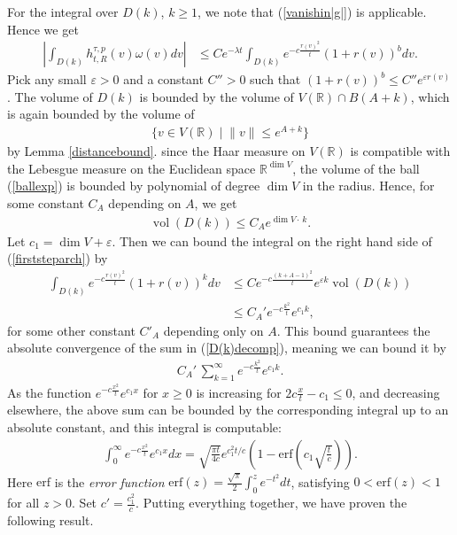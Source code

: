 \documentclass[11pt,reqno]{amsart}
\numberwithin{equation}{section}
\theoremstyle{definition}
\theoremstyle{remark}
\newcommand{\vol}{\operatorname{vol}}
\renewcommand{\dim}{\operatorname{dim}}
\newcommand{\R}{\mathbb{R}}
\renewcommand{\epsilon}{\varepsilon}
\begin{document}
For the integral over $D(k)$, $k\geq 1$, we note that (\ref{vanishin|g|}) is applicable. Hence we get
\begin{align}\label{firststeparch}
    \left\vert \int_{D(k)} h^{\tau,p}_{t,R}(v)\omega(v)dv\right\vert &\leq C e^{-\lambda t}\int_{D(k)} e^{-c\frac{r(v)^2}{t}}(1+r(v))^bdv.
\end{align}
Pick any small $\epsilon>0$ and a constant $C''>0$ such that $(1+r(v))^b\leq C''e^{\epsilon r(v)}$. The volume of $D(k)$ is bounded by the volume of $V(\R)\cap B(A+k)$, which is again bounded by the volume of
\begin{align}\label{ballexp}
    \lbrace v\in V(\R) \mid \lVert v\rVert \leq e^{A+k}\rbrace
\end{align}
by Lemma \ref{distancebound}. since the Haar measure on $V(\R)$ is compatible with the Lebesgue measure on the Euclidean space $\R^{\dim V}$, the volume of the ball (\ref{ballexp}) is bounded by polynomial of degree $\dim V$ in the radius. Hence, for some constant $C_A$ depending on $A$, we get
\begin{align*}
    \vol(D(k)) \leq C_A e^{\dim V \cdot\, k}.
\end{align*}
Let $c_1 = \dim V+\epsilon$. Then we can bound the integral on the right hand side of (\ref{firststeparch}) by
\begin{align*}
    \int_{D(k)} e^{-c\frac{r(v)^2}{t}}(1+r(v))^kdv &\leq Ce^{-c\frac{(k+A-1)^2}{t}}e^{\epsilon k}\vol(D(k)) \\
    &\leq C_A' e^{-c\frac{k^2}{t}}e^{c_1 k},
\end{align*}
for some other constant $C'_A$ depending only on $A$. This bound guarantees the absolute convergence of the sum in (\ref{D(k)decomp}), meaning we can bound it by
\begin{align*}
    C_A'\,\sum_{k=1}^\infty e^{-c\frac{k^2}{t}}e^{c_1 k}.
\end{align*}
As the function $e^{-c\frac{x^2}{t}}e^{c_1 x}$ for $x\geq 0$ is increasing for $2c\frac{x}{t}-c_1\le 0$, and decreasing elsewhere, the above sum can be bounded by the corresponding integral up to an absolute constant, and this integral is computable:
\begin{align*}
    \int_0^\infty e^{-c\frac{x^2}{t}}e^{c_1 x} dx = \sqrt{\frac{\pi t}{4c}}e^{c_1^2t/c}\left(1-\text{erf}\left(c_1\sqrt{\frac{t}{c}}\right)\right).
\end{align*}
Here $\text{erf}$ is the \textit{error function} $\text{erf}(z) = \frac{\sqrt{\pi}}{2}\int _0^z e^{-t^2}dt$, satisfying $0< \text{erf}(z) <1$ for all $z>0$. Set $c' = \frac{c_1^2}{c}$. Putting everything together, we have proven the following result.
\end{document}
